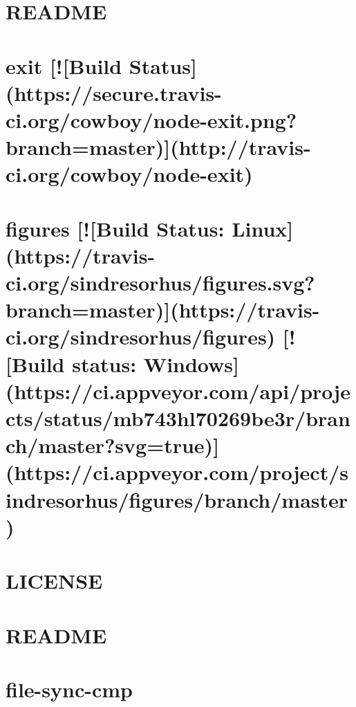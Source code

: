 \documentclass[twoside]{book}
\newcommand{\+}{\discretionary{\mbox{\scriptsize$\hookleftarrow$}}{}{}}
\begin{document}
\chapter{R\+E\+A\+D\+ME}
\label{md_app_web_node_modules_eventemitter2__r_e_a_d_m_e}

\chapter{exit \mbox{[}!\mbox{[}Build Status\mbox{]}(https\+://secure.travis-\/ci.org/cowboy/node-\/exit.png?branch=master)\mbox{]}(http\+://travis-\/ci.org/cowboy/node-\/exit)}
\label{md_app_web_node_modules_exit__r_e_a_d_m_e}

\chapter{figures \mbox{[}!\mbox{[}Build Status\+: Linux\mbox{]}(https\+://travis-\/ci.org/sindresorhus/figures.svg?branch=master)\mbox{]}(https\+://travis-\/ci.org/sindresorhus/figures) \mbox{[}!\mbox{[}Build status\+: Windows\mbox{]}(https\+://ci.appveyor.\+com/api/projects/status/mb743hl70269be3r/branch/master?svg=true)\mbox{]}(https\+://ci.appveyor.\+com/project/sindresorhus/figures/branch/master)}
\label{md_app_web_node_modules_figures_readme}

\chapter{L\+I\+C\+E\+N\+SE}
\label{md_app_web_node_modules_file-saver__l_i_c_e_n_s_e}

\chapter{R\+E\+A\+D\+ME}
\label{md_app_web_node_modules_file-saver__r_e_a_d_m_e}

\chapter{file-\/sync-\/cmp}
\label{md_app_web_node_modules_file-sync-cmp__r_e_a_d_m_e}

\end{document}
